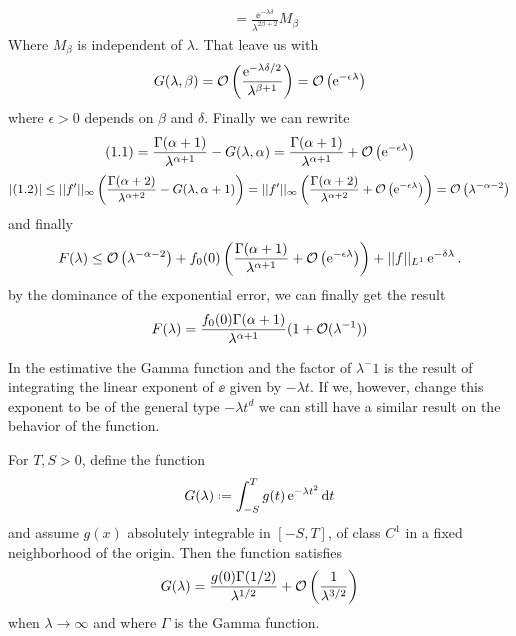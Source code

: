 \begin{Mproof}
\begin{equation*}
\begin{split}
			& = \frac{\ee^{-\lambda \delta}}{\lambda^{2\beta + 2}} M_\beta
		\end{split}
	\end{equation*}
	Where $M_\beta$ is independent of $\lambda$. That leave us with
	$$G(\lambda, \beta) = \mathcal{O}\left(\frac{\operatorname{e}^{-\lambda\delta/2}}{\lambda^{\beta+1}}\right) = \mathcal{O}\left(\operatorname{e}^{-\epsilon\lambda}\right)$$
	where $\epsilon > 0$ depends on $\beta$ and $\delta$. Finally we can rewrite
	$$(1.1) = \frac{\Gamma(\alpha + 1)}{\lambda^{\alpha +1}} - G(\lambda, \alpha) =  \frac{\Gamma(\alpha + 1)}{\lambda^{\alpha+1}} + \mathcal{O}\left(\operatorname{e}^{-\epsilon\lambda}\right)$$
	$$|(1.2)| \leq ||f'||_{\infty} \left( \frac{\Gamma(\alpha + 2)}{\lambda^{\alpha +2}} - G(\lambda, \alpha + 1) \right) = ||f'||_{\infty} \left( \frac{\Gamma(\alpha + 2)}{\lambda^{\alpha +2}} + \mathcal{O}\left(\operatorname{e}^{-\epsilon\lambda}\right) \right) = \mathcal{O}\left(\lambda^{-\alpha-2}\right)$$
	and finally
	$$F(\lambda) \leq \mathcal{O}\left(\lambda^{-\alpha-2}\right) + f_0(0) \left( \frac{\Gamma(\alpha + 1)}{\lambda^{\alpha+1}} + \mathcal{O}\left(\operatorname{e}^{-\epsilon\lambda}\right) \right) + ||f||_{L^1} \operatorname{e}^{-\delta \lambda}.$$
	by the dominance of the exponential error, we can finally get the result
	$$F(\lambda) = \frac{f_0(0) \Gamma(\alpha + 1)}{\lambda^{\alpha + 1}} (1 + \mathcal{O}(\lambda^{-1}))$$
\end{Mproof}

In the estimative the Gamma function and the factor of $\lambda^-1$ is the result of integrating the linear exponent of $\ee$ given by $-\lambda t$. If we, however, change this exponent to be of the general type $-\lambda t^d$ we can still have a similar result on the behavior of the function.

\begin{prop}	
	For $T, S > 0$, define the function
	$$G(\lambda) \deff \int_{-S}^{T} g(t) \ee^{-\lambda t^2} \dd t$$
	and assume $g(x)$ absolutely integrable in $[-S, T]$, of class $C^1$ in a fixed neighborhood of the origin. Then the function satisfies
	\begin{equation}
		G(\lambda) = \frac{g(0) \Gamma(1/2)}{\lambda^{1/2}} + \mathcal{O} \left(\frac{1}{\lambda^{3/2}} \right)
	\end{equation}
	when $\lambda \rightarrow \infty$ and where $\Gamma$ is the Gamma function.
	\label{prop: cor watson}
\end{prop}

